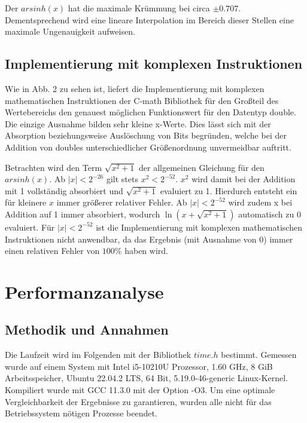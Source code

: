 \documentclass[course=erap] {aspdoc}
\begin{document}
    Der $arsinh(x)$ hat die maximale Krümmung bei circa $\pm 0.707$.
    Dementsprechend wird eine lineare Interpolation im Bereich dieser Stellen eine maximale Ungenauigkeit aufweisen.

    \subsection{Implementierung mit komplexen Instruktionen}\label{subsec:implementierung-mit-komplexen-instruktionen}

    Wie in Abb. 2 zu sehen ist, liefert die Implementierung mit komplexen mathematischen Instruktionen der C-math Bibliothek für den Großteil des Wertebereichs den genauest möglichen Funktionswert für den Datentyp double.
    Die einzige Ausnahme bilden sehr kleine x-Werte.
    Dies lässt sich mit der Absorption beziehungsweise Auslöschung von Bits begründen, welche bei der Addition von doubles unterschiedlicher Größenordnung unvermeidbar auftritt.

    Betrachten wird den Term $\sqrt{x^2 + 1}$ der allgemeinen Gleichung für den $arsinh(x)$.
    Ab $|x|<2^{-26}$ gilt stets $x^2<2^{-52}$. $x^2$ wird damit bei der Addition mit 1 vollständig absorbiert und $\sqrt{x^2 + 1}$ evaluiert zu 1.
    Hierdurch entsteht ein für kleinere $x$ immer größerer relativer Fehler.
    Ab $|x|<2^{-52}$ wird zudem x bei Addition auf 1 immer absorbiert, wodurch $\ln{(x+\sqrt{x^2 + 1})}$ automatisch zu 0 evaluiert.
    Für $|x|<2^{-52}$ ist die Implementierung mit komplexen mathematischen Instruktionen nicht anwendbar, da das Ergebnis (mit Ausnahme von 0) immer einen relativen Fehler von $100\%$ haben wird.


    \section{Performanzanalyse}\label{sec:performanzanalyse}

    \subsection{Methodik und Annahmen}\label{subsec:methodik-und-annahmen}
    Die Laufzeit wird im Folgenden mit der Bibliothek $time.h$ bestimmt.
    Gemessen wurde auf einem System mit Intel i5-10210U Prozessor, 1.60 GHz, 8 GiB Arbeitsspeicher, Ubuntu 22.04.2 LTS, 64 Bit, 5.19.0-46-generic Linux-Kernel.
    Kompiliert wurde mit GCC 11.3.0 mit der Option -O3. Um eine optimale Vergleichbarkeit der Ergebnisse zu garantieren, wurden alle nicht für das Betriebssystem nötigen Prozesse beendet.
\end{document}
